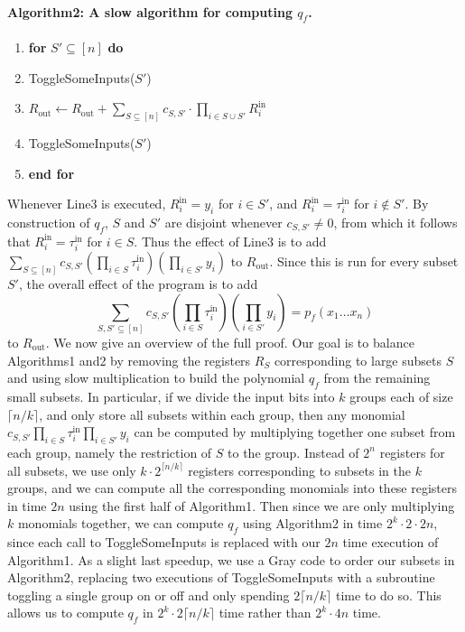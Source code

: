 \paragraph{Algorithm2: A slow algorithm for computing $q_f$.}
\begin{enumerate}[label=\arabic*:]
\item \textbf{for} $S'\subseteq[n]$ \textbf{do}
\item ToggleSomeInputs($S'$)
\item $R_{\mathrm{out}}\leftarrow R_{\mathrm{out}}+\sum_{S\subseteq[n]}c_{S,S'}\cdot\prod_{i\in S\cup S'}R_i^{\mathrm{in}}$
\item ToggleSomeInputs($S'$)
\item \textbf{end for}
\end{enumerate}
Whenever Line3 is executed, $R_i^{\mathrm{in}}=y_i$ for $i\in S'$, and $R_i^{\mathrm{in}}=\tau_i^{\mathrm{in}}$ for $i\notin S'$. By construction of $q_f$, $S$ and $S'$ are disjoint whenever $c_{S,S'}\neq0$, from which it follows that $R_i^{\mathrm{in}}=\tau_i^{\mathrm{in}}$ for $i\in S$. Thus the effect of Line3 is to add $\sum_{S\subseteq[n]}c_{S,S'}(\prod_{i\in S}\tau_i^{\mathrm{in}})(\prod_{i\in S'}y_i)$ to $R_{\mathrm{out}}$. Since this is run for every subset $S'$, the overall effect of the program is to add
\[\sum_{S,S'\subseteq[n]}c_{S,S'}\left(\prod_{i\in S}\tau_i^{\mathrm{in}}\right)\left(\prod_{i\in S'}y_i\right)=p_f(x_1\ldots x_n)\]
to $R_{\mathrm{out}}$.
We now give an overview of the full proof. Our goal is to balance Algorithms1 and2 by removing the registers $R_S$ corresponding to large subsets $S$ and using slow multiplication to build the polynomial $q_f$ from the remaining small subsets. In particular, if we divide the input bits into $k$ groups each of size $\lceil n/k\rceil$, and only store all subsets within each group, then any monomial $c_{S,S'}\prod_{i\in S}\tau_i^{\mathrm{in}}\prod_{i\in S'}y_i$ can be computed by multiplying together one subset from each group, namely the restriction of $S$ to the group. Instead of $2^n$ registers for all subsets, we use only $k\cdot2^{\lceil n/k\rceil}$ registers corresponding to subsets in the $k$ groups, and we can compute all the corresponding monomials into these registers in time $2n$ using the first half of Algorithm1. Then since we are only multiplying $k$ monomials together, we can compute $q_f$ using Algorithm2 in time $2^k\cdot2\cdot2n$, since each call to ToggleSomeInputs is replaced with our $2n$ time execution of Algorithm1.
As a slight last speedup, we use a Gray code to order our subsets in Algorithm2, replacing two executions of ToggleSomeInputs with a subroutine toggling a single group on or off and only spending $2\lceil n/k\rceil$ time to do so. This allows us to compute $q_f$ in $2^k\cdot2\lceil n/k\rceil$ time rather than $2^k\cdot4n$ time.
